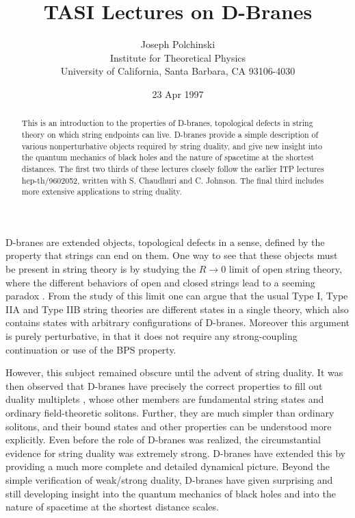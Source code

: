 \documentclass[12pt]{article}
\begin{document}
\date{23 Apr 1997}
\title{TASI Lectures on D-Branes}
\author{Joseph Polchinski \\
Institute for Theoretical Physics\\
University of California, Santa Barbara, CA 93106-4030}

\maketitle

\begin{abstract}
This is an introduction to the properties of D-branes, topological defects in
string theory on which string endpoints can live.  D-branes provide a simple
description of various nonperturbative objects required by string duality,
and give new insight into the quantum mechanics of black holes and the nature
of spacetime at the shortest distances.
The first two thirds of these lectures
closely follow the earlier ITP lectures hep-th/9602052, written with S.
Chaudhuri and C. Johnson.  The final third includes more extensive
applications to string duality.
\end{abstract}

\newpage
  
D-branes are extended objects, topological defects in a sense, defined by the
property that strings can end on them.  One way to see that these objects 
must be present in string theory is by studying the
$R \to 0$ limit of open string theory, where the different behaviors of open
and closed strings lead to a seeming paradox \cite{dlp}. From the study of
this limit one can argue that the usual Type I, Type IIA and Type IIB string
theories are different states in a single theory, which also contains states
with arbitrary configurations of D-branes.  Moreover this argument is purely
perturbative, in that it does not require any strong-coupling continuation or
use of the BPS property.  

However, this subject remained obscure until the advent of string duality.  It
was then observed that D-branes have precisely the correct properties to fill
out duality multiplets \cite{joeone}, whose other members are fundamental string
states and ordinary field-theoretic solitons.  Further, they are much simpler
than ordinary solitons, and their bound states and other properties can be
understood more explicitly.  Even before the role of D-branes was
realized, the circumstantial evidence for string duality was 
extremely strong.  D-branes have extended this by providing a much more
complete and detailed dynamical picture.
Beyond the simple verification of weak/strong duality, D-branes have given
surprising and still developing insight into the quantum mechanics of black
holes and into the nature of spacetime at the shortest distance scales.
\end{document}
